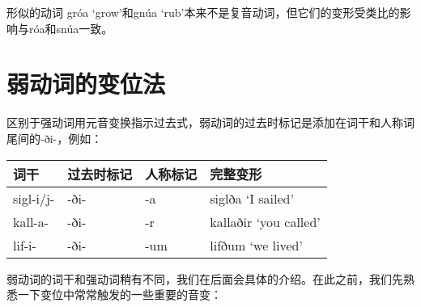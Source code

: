 形似的动词 gróa `grow‌'和gnúa `rub‌'本来不是复音动词，但它们的变形受类比的影响与róa和snúa一致。

\section{弱动词的变位法}\label{弱动词的变位法}

区别于强动词用元音变换指示过去式，弱动词的过去时标记是添加在词干和人称词尾间的-ði-，例如：

\begin{longtable}{llll}
    \toprule
    词干      & 过去时标记 & 人称标记 & 完整变形              \\
    \midrule
    \endhead
    \bottomrule
    \endfoot
    sigl-i/j- & -ði-       & -a       & siglða `I sailed‌'     \\
    kall-a-   & -ði-       & -r       & kallaðir `you called‌' \\
    lif-i-    & -ði-       & -um      & lifðum `we lived‌'     \\
\end{longtable}

弱动词的词干和强动词稍有不同，我们在后面会具体的介绍。在此之前，我们先熟悉一下变位中常常触发的一些重要的音变：

